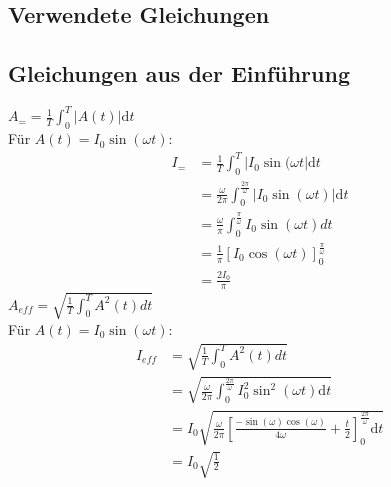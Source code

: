 

\subsection{Verwendete Gleichungen}\label{VGuD}








\subsection{Gleichungen aus der Einführung}
$A_= =\frac{1}{T}\int_{0}^{T}|A(t)|\text{d}t$\\
Für $A(t)=I_0\sin (\omega t)$:
\begin{align*}
	I_=  &=\frac{1}{T}\int_{0}^{T}|I_0\sin (\omega t|\text{d}t\\
		&=\frac{\omega}{2\pi}\int_{0}^{\frac{2\pi}{\omega}}|I_0\sin (\omega t)| \text{d}t\\
		&=\frac{\omega}{\pi}\int_{0}^{\frac{\pi}{\omega}}I_0\sin (\omega t) dt\\
		&=\frac{1}{\pi}\left[ I_0\cos(\omega t) \right]_0^{\frac{\pi}{\omega}}\\
		&=\frac{2I_0}{\pi}
\end{align*}
$A_{eff}=\sqrt{\frac{1}{T}\int_{0}^{T} A^2(t)dt}$\\
Für $A(t)=I_0\sin (\omega t)$:
\begin{align*}
	I_{eff}&=\sqrt{\frac{1}{T}\int_{0}^{T} A^2(t)dt}	\\
		   &=\sqrt{\frac{\omega}{2\pi}\int_{0}^{\frac{2\pi}{\omega}}I_0^2\sin^2 (\omega t)\text{d}t}\\
		   &=I_0\sqrt{\frac{\omega}{2\pi}\left[  \frac{-\sin(\omega)\cos(\omega)}{4\omega}+\frac{t}{2} \right]_0^{\frac{2\pi}{\omega}}\text{d}t}\\
		   &=I_0\sqrt{\frac{1}{2}}
\end{align*}
